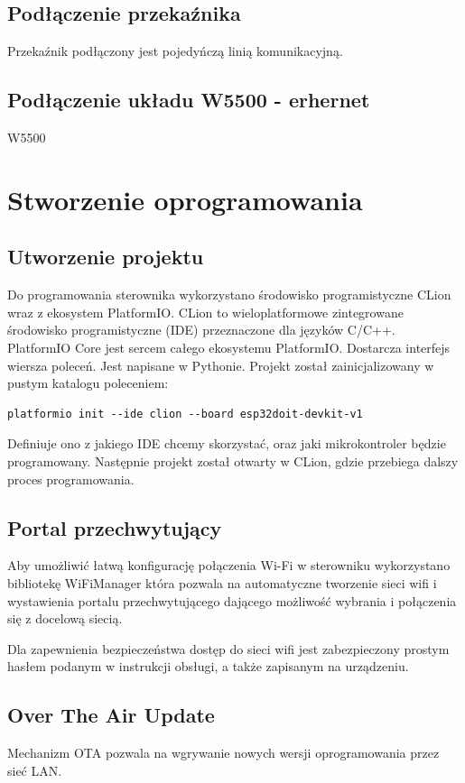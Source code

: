 \documentclass[12pt]{report}
\begin{document}
 \section{Podłączenie przekaźnika}
 Przekaźnik podłączony jest pojedyńczą linią komunikacyjną.
 
  \section{Podłączenie układu W5500 - erhernet}
 W5500 
 
 \chapter{Stworzenie oprogramowania}\label{rozdz.stworzenie}
 
 \section{Utworzenie projektu}
 Do programowania sterownika wykorzystano środowisko programistyczne CLion wraz z ekosystem PlatformIO.
 CLion to wieloplatformowe zintegrowane środowisko programistyczne (IDE) przeznaczone dla języków C/C++.
 PlatformIO Core jest sercem całego ekosystemu PlatformIO. Dostarcza interfejs wiersza poleceń. Jest napisane w Pythonie.
 Projekt został zainicjalizowany w pustym katalogu poleceniem:
 \begin{lstlisting}
platformio init --ide clion --board esp32doit-devkit-v1 
 \end{lstlisting}
 Definiuje ono z jakiego IDE chcemy skorzystać, oraz jaki mikrokontroler będzie programowany.
 Następnie projekt został otwarty w CLion, gdzie przebiega dalszy proces programowania.
 
 \section{Portal przechwytujący}
 Aby umożliwić łatwą konfigurację połączenia Wi-Fi w sterowniku wykorzystano bibliotekę WiFiManager która pozwala na automatyczne tworzenie sieci wifi i wystawienia portalu przechwytującego dającego możliwość wybrania i połączenia się z docelową siecią. 
 
 Dla zapewnienia bezpieczeństwa dostęp do sieci wifi jest zabezpieczony prostym hasłem podanym w instrukcji obsługi, a także zapisanym na urządzeniu.
 
 \section{Over The Air Update}
 Mechanizm OTA pozwala na wgrywanie nowych wersji oprogramowania przez sieć LAN.
 
\end{document}
